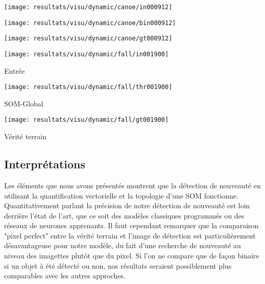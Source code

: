 	\begin{figureth}
		\begin{subfigureth}{.32\textwidth}
			\texttt{[image: resultats/visu/dynamic/canoe/in000912]}
		\end{subfigureth}
		\begin{subfigureth}{.32\textwidth}
			\texttt{[image: resultats/visu/dynamic/canoe/bin000912]}
		\end{subfigureth}
		\begin{subfigureth}{.32\textwidth}
			\texttt{[image: resultats/visu/dynamic/canoe/gt000912]}
		\end{subfigureth}

		\begin{subfigureth}{.32\textwidth}
			\texttt{[image: resultats/visu/dynamic/fall/in001900]} \caption{Entrée}
		\end{subfigureth}
		\begin{subfigureth}{.32\textwidth}
			\texttt{[image: resultats/visu/dynamic/fall/thr001900]} \caption{SOM-Global}
		\end{subfigureth}
		\begin{subfigureth}{.32\textwidth}
			\texttt{[image: resultats/visu/dynamic/fall/gt001900]} \caption{Vérité terrain}
		\end{subfigureth}

		\caption[]{}\label{fig:res:visu-dynamic}
	\end{figureth}

	\subsection{Interprétations}

	Les éléments que nous avons présentés montrent que la détection de nouveauté en utilisant la quantification vectorielle et la topologie d'une SOM fonctionne. Quantitativement parlant la précision de notre détection de nouveauté est loin derrière l'état de l'art, que ce soit des modèles classiques programmés ou des réseaux de neurones apprenants. Il faut cependant remarquer que la comparaison "pixel perfect" entre la vérité terrain et l'image de détection est particulièrement désavantageuse pour notre modèle, du fait d'une recherche de nouveauté au niveau des imagettes plutôt que du pixel. Si l'on ne compare que de façon binaire si un objet à été détecté ou non, nos résultats seraient possiblement plus comparables avec les autres approches.
	
